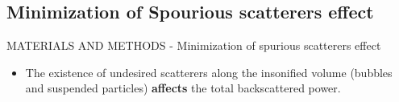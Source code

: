 \documentclass[handout]{beamer}
\newcommand\Fontable{\fontsize{9}{10}\selectfont}
\begin{document}
\subsection{Minimization of Spourious scatterers effect}

\begin{frame}{MATERIALS AND METHODS - Minimization of spurious scatterers effect}
\Fontable
\begin{itemize}
\item<2-> The existence of undesired scatterers along the insonified volume (bubbles and suspended particles) \textbf{affects} the total backscattered power.

\vspace{2px}
\centering
{}
\end{itemize}


\end{frame}
\end{document}
